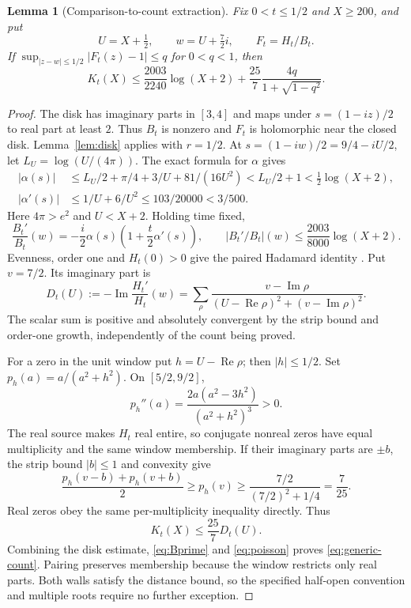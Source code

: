 \documentclass[11pt]{article}
\newtheorem{lemma}[theorem]{Lemma}
\theoremstyle{remark}
\newcommand{\abs}[1]{\left\lvert#1\right\rvert}
\numberwithin{equation}{section}
\begin{document}
\begin{lemma}[Comparison-to-count extraction]\label{lem:extract}
Fix $0<t\le1/2$ and $X\ge200$, and put
\[
 U=X+\tfrac12,\qquad w=U+\tfrac72i,\qquad F_t=H_t/B_t.
\]
If $\sup_{|z-w|\le1/2}|F_t(z)-1|\le q$ for $0<q<1$, then
\begin{equation}\label{eq:generic-count}
 K_t(X)\le\frac{2003}{2240}\log(X+2)
        +\frac{25}{7}\frac{4q}{1+\sqrt{1-q^2}}.
\end{equation}
\end{lemma}
\begin{proof}
The disk has imaginary parts in $[3,4]$ and maps under $s=(1-iz)/2$
to real part at least $2$. Thus $B_t$ is nonzero and $F_t$ is
holomorphic near the closed disk. Lemma~\ref{lem:disk} applies with
$r=1/2$. At $s=(1-iw)/2=9/4-iU/2$, let $L_U=\log(U/(4\pi))$.
The exact formula for $\alpha$ gives
\begin{align*}
 |\alpha(s)|&\le L_U/2+\pi/4+3/U+81/(16U^2)
              <L_U/2+1<\tfrac12\log(X+2),\\
 |\alpha'(s)|&\le1/U+6/U^2\le103/20000<3/500.
\end{align*}
Here $4\pi>e^2$ and $U<X+2$. Holding time fixed,
\begin{equation}\label{eq:Bprime}
 \frac{B_t'}{B_t}(w)=-\frac i2\alpha(s)
    \left(1+\frac t2\alpha'(s)\right),\qquad
 \abs{B_t'/B_t}(w)\le\frac{2003}{8000}\log(X+2).
\end{equation}
Evenness, order one and $H_t(0)>0$ give the paired Hadamard identity
\cite[(105)]{polymath}. Put $v=7/2$. Its imaginary part is
\begin{equation}\label{eq:poisson}
 D_t(U):=-\operatorname{Im}\frac{H_t'}{H_t}(w)
 =\sum_\rho\frac{v-\operatorname{Im}\rho}
 {(U-\operatorname{Re}\rho)^2+(v-\operatorname{Im}\rho)^2}.
\end{equation}
The scalar sum is positive and absolutely convergent by the strip
bound and order-one growth, independently of the count being proved.

For a zero in the unit window put $h=U-\operatorname{Re}\rho$;
then $|h|\le1/2$. Set $p_h(a)=a/(a^2+h^2)$. On $[5/2,9/2]$,
\[
 p_h''(a)=\frac{2a(a^2-3h^2)}{(a^2+h^2)^3}>0.
\]
The real source makes $H_t$ real entire, so conjugate nonreal zeros
have equal multiplicity and the same window membership. If their
imaginary parts are $\pm b$, the strip bound $|b|\le1$ and convexity give
\[
 \frac{p_h(v-b)+p_h(v+b)}2\ge p_h(v)
 \ge\frac{7/2}{(7/2)^2+1/4}=\frac7{25}.
\]
Real zeros obey the same per-multiplicity inequality directly. Thus
\begin{equation}\label{eq:paired-kernel-count}
 K_t(X)\le\frac{25}{7}D_t(U).
\end{equation}
Combining the disk estimate, \eqref{eq:Bprime} and
\eqref{eq:poisson} proves \eqref{eq:generic-count}.
Pairing preserves membership because the window restricts only real
parts. Both walls satisfy the distance bound, so the specified half-open
convention and multiple roots require no further exception.
\end{proof}
\end{document}
